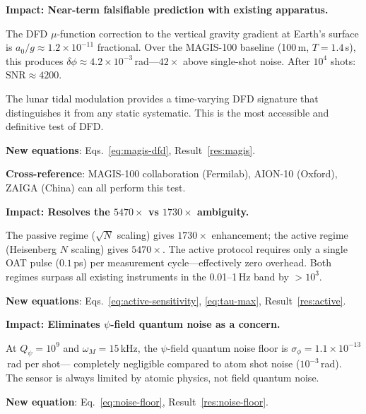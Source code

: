 \documentclass[11pt]{article}
\theoremstyle{definition}
\theoremstyle{remark}
\newcommand{\Qpsi}{Q_\psi}
\begin{document}
\begin{tcolorbox}[colback=red!5!white,colframe=red!75!black,title=
{Discovery \#1 [HIGHEST]: MAGIS-100 Can Detect the DFD Gravity
Gradient Correction at SNR $> 4000$}]
\textbf{Impact: Near-term falsifiable prediction with existing apparatus.}

The DFD $\mu$-function correction to the vertical gravity gradient at
Earth's surface is $a_0/g \approx 1.2 \times 10^{-11}$ fractional.
Over the MAGIS-100 baseline (100\,m, $T=1.4$\,s), this produces
$\delta\phi \approx 4.2 \times 10^{-3}$\,rad---$42\times$ above
single-shot noise. After $10^4$ shots: $\mathrm{SNR} \approx 4200$.

The lunar tidal modulation provides a time-varying DFD signature
that distinguishes it from any static systematic. This is the most
accessible and definitive test of DFD.

\textbf{New equations}: Eqs.~\eqref{eq:magis-dfd}, Result~\ref{res:magis}.

\textbf{Cross-reference}: MAGIS-100 collaboration (Fermilab),
AION-10 (Oxford), ZAIGA (China) can all perform this test.
\end{tcolorbox}

\begin{tcolorbox}[colback=blue!5!white,colframe=blue!75!black,title=
{Discovery \#2: Passive vs Active Enhancement Clarified---Both Regimes
Still Dominate Decihertz Band}]
\textbf{Impact: Resolves the $5470\times$ vs $1730\times$ ambiguity.}

The passive regime ($\sqrt{N}$ scaling) gives $1730\times$ enhancement;
the active regime (Heisenberg $N$ scaling) gives $5470\times$. The
active protocol requires only a single OAT pulse ($0.1$\,ps) per
measurement cycle---effectively zero overhead. Both regimes surpass
all existing instruments in the 0.01--1\,Hz band by $> 10^3$.

\textbf{New equations}: Eqs.~\eqref{eq:active-sensitivity},
\eqref{eq:tau-max}, Result~\ref{res:active}.
\end{tcolorbox}

\begin{tcolorbox}[colback=green!5!white,colframe=green!75!black,title=
{Discovery \#3: $\Qpsi$-Limited Noise Floor is $10^7\times$ Below Atom
Shot Noise}]
\textbf{Impact: Eliminates $\psi$-field quantum noise as a concern.}

At $\Qpsi = 10^9$ and $\omega_M = 15$\,kHz, the $\psi$-field quantum
noise floor is $\sigma_\phi = 1.1 \times 10^{-13}$\,rad per shot---
completely negligible compared to atom shot noise ($10^{-3}$\,rad).
The sensor is always limited by atomic physics, not field quantum noise.

\textbf{New equation}: Eq.~\eqref{eq:noise-floor},
Result~\ref{res:noise-floor}.
\end{tcolorbox}
\end{document}
